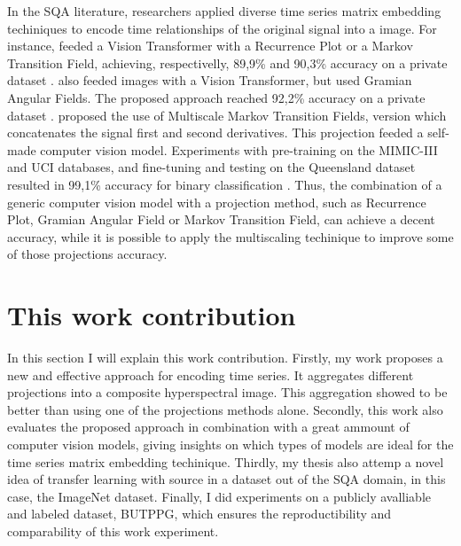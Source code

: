 In the \acrshort{SQA} literature, researchers applied diverse time series matrix embedding techiniques to encode time relationships of the original signal into a image. For instance, \citeauthor{review-16} feeded a Vision Transformer with a Recurrence Plot or a Markov Transition Field, achieving, respectivelly, 89,9\% and 90,3\% accuracy on a private dataset \cite{review-16}. \citeauthor{review-17} also feeded images with a Vision Transformer, but used Gramian Angular Fields. The proposed approach reached 92,2\% accuracy on a private dataset \cite{review-17}. \citeauthor{review-18} proposed the use of Multiscale Markov Transition Fields, version which concatenates the signal first and second derivatives. This projection feeded a self-made computer vision model. Experiments with pre-training on the MIMIC-III and UCI databases, and fine-tuning and testing on the Queensland dataset resulted in 99,1\% accuracy for binary classification \cite{review-18}. Thus, the combination of a generic computer vision model with a projection method, such as Recurrence Plot, Gramian Angular Field or Markov Transition Field, can achieve a decent accuracy, while it is possible to apply the multiscaling techinique to improve some of those projections accuracy. 
 


\section{This work contribution}
\label{sec:my_work}

In this section I will explain this work contribution. Firstly, my work proposes a new and effective approach for encoding time series. It aggregates different projections into a composite hyperspectral image. This aggregation showed to be better than using one of the projections methods alone. Secondly, this work also evaluates the proposed approach in combination with a great ammount of computer vision models, giving insights on which types of models are ideal for the time series matrix embedding techinique. Thirdly, my thesis also attemp a novel idea of transfer learning with source in a dataset out of the \acrshort{SQA} domain, in this case, the ImageNet dataset. Finally, I did experiments on a  publicly avalliable and labeled dataset, \acrfull{BUTPPG}, which ensures the reproductibility and comparability of this work experiment.  
